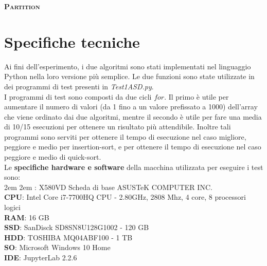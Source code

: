 \documentclass{article}
\begin{document}
\vspace{0.15in}

\noindent\textbf{\textsc{Partition}}\\
\vspace{0.0002in}

\section{Specifiche tecniche}
Ai fini dell'esperimento, i due algoritmi sono stati implementati nel linguaggio Python nella loro versione più semplice.
Le due funzioni sono state utilizzate in dei programmi di test presenti in {\em Test1ASD.py}. \\
I programmi di test sono composti da due cicli $for$. Il primo è utile per aumentare il numero di valori (da 1 fino a un valore prefissato a 1000) dell'array che viene ordinato dai due algoritmi, mentre il secondo è utile per fare una media di 10/15 esecuzioni per ottenere un risultato più attendibile.
Inoltre tali programmi sono serviti per ottenere il tempo di esecuzione nel caso migliore, peggiore e medio per insertion-sort, e per ottenere il tempo di esecuzione nel caso peggiore e medio di quick-sort. \\

Le {\bf specifiche hardware e software} della macchina utilizzata per eseguire i test sono:\\

\begingroup
\leftskip2em \rightskip2em
: X580VD Scheda di base ASUSTeK COMPUTER INC.\\
{\bf CPU}:  Intel Core i7-7700HQ CPU - 2.80GHz, 2808 Mhz, 4 core, 8 processori logici\\
{\bf RAM}: 16 GB\\
{\bf SSD}: SanDisck SD8SN8U128G1002 - 120 GB\\
{\bf HDD}: TOSHIBA MQ04ABF100 - 1 TB\\
{\bf SO}: Microsoft Windows 10 Home \\
{\bf IDE}: JupyterLab 2.2.6 \\
\end{document}
